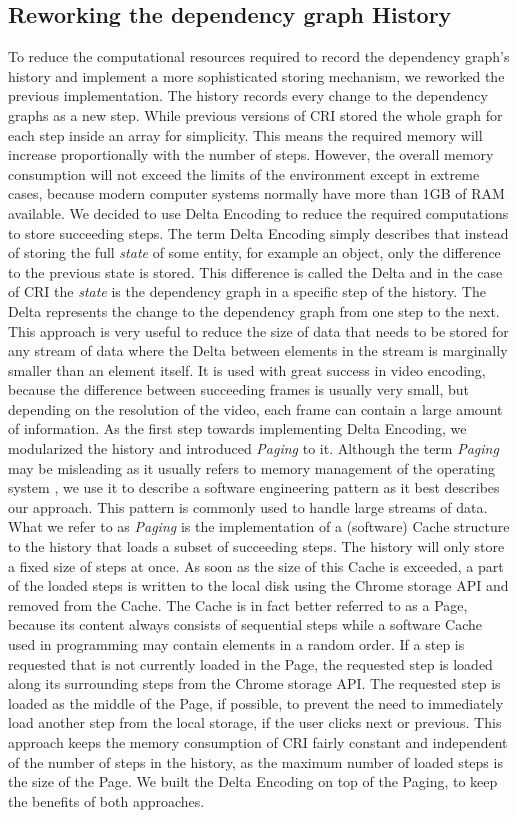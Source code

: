 \subsection{Reworking the dependency graph History}
To reduce the computational resources required to record the dependency graph's history and implement a more sophisticated storing mechanism, we reworked the previous implementation. The history records every change to the dependency graphs as a new step. While previous versions of CRI stored the whole graph for each step inside an array for simplicity. This means the required memory will increase proportionally with the number of steps. However, the overall memory consumption will not exceed the limits of the environment except in extreme cases, because modern computer systems normally have more than 1GB of RAM available. We decided to use Delta Encoding to reduce the required computations to store succeeding steps. The term Delta Encoding simply describes that instead of storing the full \emph{state} of some entity, for example an object, only the difference to the previous state is stored. This difference is called the Delta and in the case of CRI the \emph{state} is the dependency graph in a specific step of the history. The Delta represents the change to the dependency graph from one step to the next. This approach is very useful to reduce the size of data that needs to be stored for any stream of data where the Delta between elements in the stream is marginally smaller than an element itself. It is used with great success in video encoding, because the difference between succeeding frames is usually very small, but depending on the resolution of the video, each frame can contain a large amount of information.
As the first step towards implementing Delta Encoding, we modularized the history and introduced \emph{Paging} to it. Although the term \emph{Paging} may be misleading as it usually refers to memory management of the operating system \cite{PagingWiki}, we use it to describe a software engineering pattern as it best describes our approach. This pattern is commonly used to handle large streams of data. What we refer to as \emph{Paging} is the implementation of a (software) Cache structure to the history that loads a subset of succeeding steps. The history will only store a fixed size of steps at once. As soon as the size of this Cache is exceeded, a part of the loaded steps is written to the local disk using the Chrome storage API and removed from the Cache. The Cache is in fact better referred to as a Page, because its content always consists of sequential steps while a software Cache used in programming may contain elements in a random order. If a step is requested that is not currently loaded in the Page, the requested step is loaded along its surrounding steps from the Chrome storage API. The requested step is loaded as the middle of the Page, if possible, to prevent the need to immediately load another step from the local storage, if the user clicks next or previous. This approach keeps the memory consumption of CRI fairly constant and independent of the number of steps in the history, as the maximum number of loaded steps is the size of the Page. We built the Delta Encoding on top of the Paging, to keep the benefits of both approaches.
